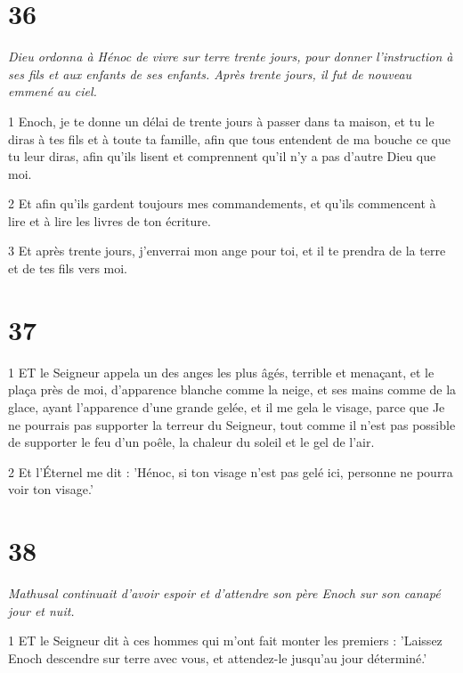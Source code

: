 \chapter{36}

\par \textit{Dieu ordonna à Hénoc de vivre sur terre trente jours, pour donner l'instruction à ses fils et aux enfants de ses enfants. Après trente jours, il fut de nouveau emmené au ciel.}

\par 1 Enoch, je te donne un délai de trente jours à passer dans ta maison, et tu le diras à tes fils et à toute ta famille, afin que tous entendent de ma bouche ce que tu leur diras, afin qu'ils lisent et comprennent qu'il n'y a pas d'autre Dieu que moi.

\par 2 Et afin qu'ils gardent toujours mes commandements, et qu'ils commencent à lire et à lire les livres de ton écriture.

\par 3 Et après trente jours, j'enverrai mon ange pour toi, et il te prendra de la terre et de tes fils vers moi.

\chapter{37}

\par 1 ET le Seigneur appela un des anges les plus âgés, terrible et menaçant, et le plaça près de moi, d'apparence blanche comme la neige, et ses mains comme de la glace, ayant l'apparence d'une grande gelée, et il me gela le visage, parce que Je ne pourrais pas supporter la terreur du Seigneur, tout comme il n'est pas possible de supporter le feu d'un poêle, la chaleur du soleil et le gel de l'air.

\par 2 Et l'Éternel me dit : 'Hénoc, si ton visage n'est pas gelé ici, personne ne pourra voir ton visage.'

\chapter{38}

\par \textit{Mathusal continuait d'avoir espoir et d'attendre son père Enoch sur son canapé jour et nuit.}

\par 1 ET le Seigneur dit à ces hommes qui m'ont fait monter les premiers : 'Laissez Enoch descendre sur terre avec vous, et attendez-le jusqu'au jour déterminé.'

